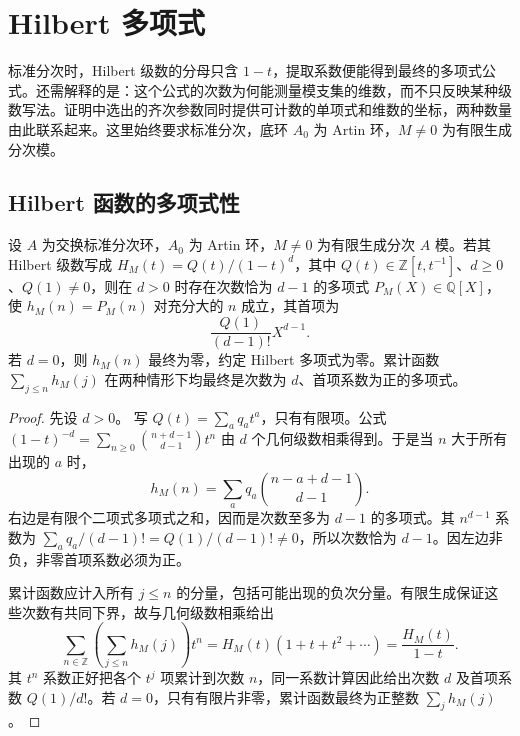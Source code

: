 
\section{Hilbert 多项式}
\label{b3:sec:1103}

标准分次时，Hilbert 级数的分母只含 \(1-t\)，提取系数便能得到最终的多项式公式。还需解释的是：这个公式的次数为何能测量模支集的维数，而不只反映某种级数写法。证明中选出的齐次参数同时提供可计数的单项式和维数的坐标，两种数量由此联系起来。这里始终要求标准分次，底环 \(A_0\) 为 Artin 环，\(M\ne0\) 为有限生成分次模。

\subsection{Hilbert 函数的多项式性}
\label{b3:subsec:1103:01}

\begin{proposition}\label{b3:prop:hilbert-eventual-polynomial}
	设 \(A\) 为交换标准分次环，\(A_0\) 为 Artin 环，\(M\ne0\) 为有限生成分次 \(A\) 模。若其 Hilbert 级数写成 \(H_M(t)=Q(t)/(1-t)^d\)，其中 \(Q(t)\in\mathbb Z[t,t^{-1}]\)、\(d\ge0\)、\(Q(1)\ne0\)，则在 \(d>0\) 时存在次数恰为 \(d-1\) 的多项式 \(P_M(X)\in\mathbb Q[X]\)，使 \(h_M(n)=P_M(n)\) 对充分大的 \(n\) 成立，其首项为
	\[
		\dfrac{Q(1)}{(d-1)!}X^{d-1}.
	\]
	若 \(d=0\)，则 \(h_M(n)\) 最终为零，约定 Hilbert 多项式为零。累计函数 \(\sum_{j\le n}h_M(j)\) 在两种情形下均最终是次数为 \(d\)、首项系数为正的多项式。
\end{proposition}
\begin{proof}
	先设 \(d>0\)。 写 \(Q(t)=\sum_a q_a t^a\)，只有有限项。公式 \((1-t)^{-d}=\sum_{n\ge0}\binom{n+d-1}{d-1}t^n\) 由 \(d\) 个几何级数相乘得到。于是当 \(n\) 大于所有出现的 \(a\) 时，
	\[
		h_M(n)=\sum_a q_a\binom{n-a+d-1}{d-1}.
	\]
	右边是有限个二项式多项式之和，因而是次数至多为 \(d-1\) 的多项式。其 \(n^{d-1}\) 系数为 \(\sum_aq_a/(d-1)!=Q(1)/(d-1)!\ne0\)，所以次数恰为 \(d-1\)。因左边非负，非零首项系数必须为正。

	累计函数应计入所有 \(j\le n\) 的分量，包括可能出现的负次分量。有限生成保证这些次数有共同下界，故与几何级数相乘给出
	\[
		\sum_{n\in\mathbb Z}\left(\sum_{j\le n}h_M(j)\right)t^n =H_M(t)(1+t+t^2+\cdots)=\frac{H_M(t)}{1-t}.
	\]
	其 \(t^n\) 系数正好把各个 \(t^j\) 项累计到次数 \(n\)，同一系数计算因此给出次数 \(d\) 及首项系数 \(Q(1)/d!\)。若 \(d=0\)，只有有限片非零，累计函数最终为正整数 \(\sum_j h_M(j)\)。
\end{proof}

